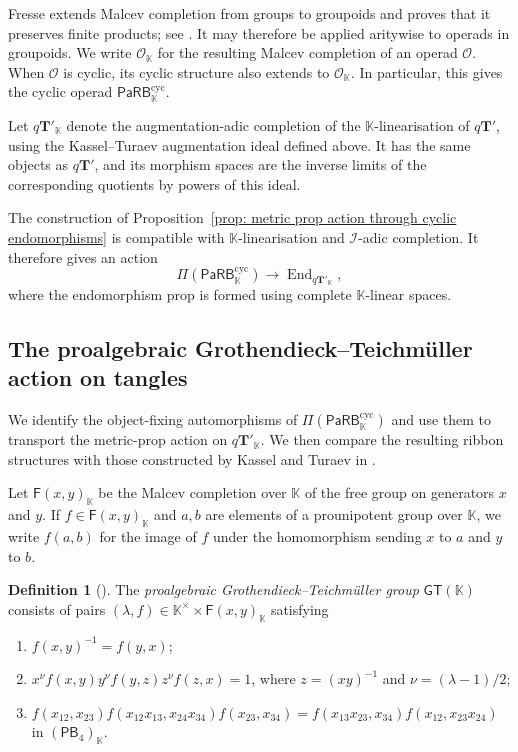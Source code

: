 \documentclass{amsart}
\newcommand{\bT}{\mathbf{T}}
\newcommand{\calO}{\mathcal{O}}
\newcommand{\kk}{\mathbb{K}}    %
\newcommand{\PaRB}{\mathsf{PaRB}}
\newcommand{\End}{\operatorname{End}}
\newcommand{\gt}{\mathsf{GT}}
\newcommand{\PB}{\mathsf{PB}} %
\theoremstyle{definition}
\newtheorem{definition}[theorem]{Definition}%
\numberwithin{equation}{section}
\begin{document}
Fresse extends Malcev completion from groups to groupoids and
proves that it preserves finite products; see
\cite[Sections~9.1--9.2 and Proposition~9.2.2]{FresseBook1}.
It may therefore be applied aritywise to operads in groupoids.
We write $\calO_{\kk}$ for the resulting Malcev completion
of an operad $\calO$. When $\calO$ is cyclic, its cyclic
structure also extends to $\calO_{\kk}$. In particular,
this gives the cyclic operad $\PaRB_{\kk}^{\mathrm{cyc}}$.

Let $q\bT'_{\kk}$ denote the augmentation-adic completion
of the $\kk$-linearisation of $q\bT'$, using the
Kassel--Turaev augmentation ideal defined above.
It has the same objects as $q\bT'$, and its morphism
spaces are the inverse limits of the corresponding
quotients by powers of this ideal.

The construction of
Proposition~\ref{prop: metric prop action through cyclic endomorphisms}
is compatible with $\kk$-linearisation and $\mathcal I$-adic
completion. It therefore gives an action
\[
\Pi(\PaRB_{\kk}^{\mathrm{cyc}})
\longrightarrow
\End_{q\bT'_{\kk}},
\]
where the endomorphism prop is formed using complete
$\kk$-linear spaces.

\subsection{The proalgebraic Grothendieck--Teichmüller action on tangles}
\label{subsec:GT action on turaev category}

We identify the object-fixing automorphisms of
$\Pi(\PaRB_{\kk}^{\mathrm{cyc}})$ and use them to transport
the metric-prop action on $q\bT'_{\kk}$. We then compare the
resulting ribbon structures with those constructed by Kassel
and Turaev in \cite[Appendix~D]{KT_Tangles}.

Let $\mathsf F(x,y)_{\kk}$ be the Malcev completion over $\kk$
of the free group on generators $x$ and $y$. If
$f\in\mathsf F(x,y)_{\kk}$ and $a,b$ are elements of a
prounipotent group over $\kk$, we write $f(a,b)$ for the image
of $f$ under the homomorphism sending $x$ to $a$ and $y$ to $b$.

\begin{definition}[{\cite{Drin}}]
\label{defn: prounipotent GT}
The \emph{proalgebraic Grothendieck--Teichmüller group}
$\gt(\kk)$ consists of pairs
$(\lambda,f)\in\kk^\times\times\mathsf F(x,y)_{\kk}$ satisfying
\begin{enumerate}
\item
$f(x,y)^{-1}=f(y,x)$;

\item
$x^\nu f(x,y)y^\nu f(y,z)z^\nu f(z,x)=1$, where
$z=(xy)^{-1}$ and $\nu=(\lambda-1)/2$;

\item
$f(x_{12},x_{23}) f(x_{12}x_{13},x_{24}x_{34}) f(x_{23},x_{34}) = f(x_{13}x_{23},x_{34}) f(x_{12},x_{23}x_{24})$
in $(\PB_4)_{\kk}$.
\end{enumerate}
\end{definition}
\end{document}
